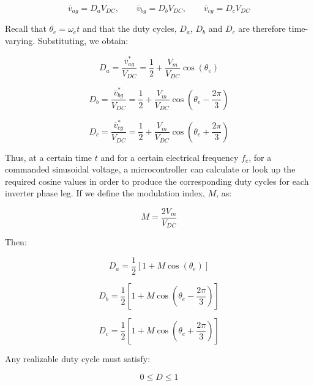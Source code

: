 \documentclass{article}
\begin{document}
\begin{equation}
    \overline{v}_{ag} = D_aV_{DC}, \qquad
    \overline{v}_{bg} = D_bV_{DC}, \qquad
    \overline{v}_{cg} = D_cV_{DC}
\end{equation}

Recall that $\theta_e = \omega_e t$ and that the duty cycles, $D_a$, $D_b$ and $D_c$ are therefore time-varying. Substituting, we obtain:

\begin{equation}
    D_a = \frac{\overline{v}_{ag}^*}{V_{DC}} = \frac{1}{2} + \frac{V_m}{V_{DC}}\cos(\theta_e)
\end{equation}

\begin{equation}
    D_b = \frac{\overline{v}_{bg}^*}{V_{DC}} = \frac{1}{2} + \frac{V_m}{V_{DC}}\cos(\theta_e - \frac{2\pi}{3})
\end{equation}

\begin{equation}
    D_c = \frac{\overline{v}_{cg}^*}{V_{DC}} = \frac{1}{2} + \frac{V_m}{V_{DC}}\cos(\theta_e + \frac{2\pi}{3})
\end{equation}

Thus, at a certain time $t$ and for a certain electrical frequency $f_e$, for a commanded sinusoidal voltage, a microcontroller can calculate or look up the required cosine values in order to produce the corresponding duty cycles for each inverter phase leg. If we define the modulation index, $M$, as:

\begin{equation}
    M = \frac{2V_m}{V_{DC}}
\end{equation}

Then:

\begin{equation}
\label{eqn:Da-spwm}
    D_a = \frac{1}{2}[1 + M\cos(\theta_e)]
\end{equation}

\begin{equation}
\label{eqn:Db-spwm}
    D_b = \frac{1}{2}[1 + M\cos(\theta_e - \frac{2\pi}{3})]
\end{equation}

\begin{equation}
\label{eqn:Dc-spwm}
    D_c = \frac{1}{2}[1 + M\cos(\theta_e + \frac{2\pi}{3})]
\end{equation}

Any realizable duty cycle must satisfy:

\[
    0 \leq D \leq 1
\]
\end{document}
